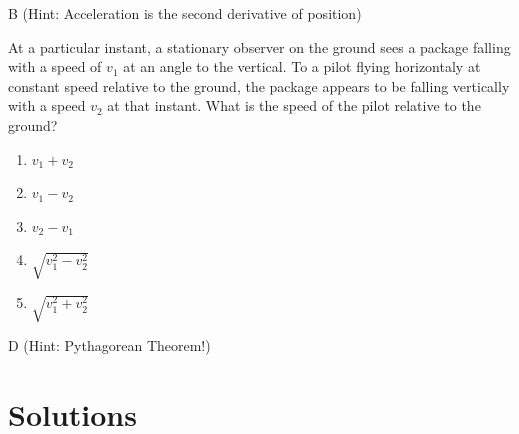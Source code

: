 \begin{solution}
B (Hint: Acceleration is the second derivative of position)
\end{solution}


\begin{question}
At a particular instant, a stationary observer on the ground sees a package falling with a speed of $v_1$ at an angle to the vertical. To a pilot flying horizontaly at constant speed relative to the ground, the package appears to be falling vertically with a speed $v_2$ at that instant. What is the speed of the pilot relative to the ground?

\begin{multicols}{5}
\begin{enumerate}
    \item $v_1+v_2$
    \item $v_1-v_2$
    \item $v_2-v_1$
    \item $\sqrt{v_1^2-v_2^2}$
    \item $\sqrt{v_1^2+v_2^2}$
\end{enumerate}
\end{multicols}
\end{question}

\begin{solution}
D (Hint: Pythagorean Theorem!)
\end{solution}


\newpage
\section{Solutions}


\printsolutions